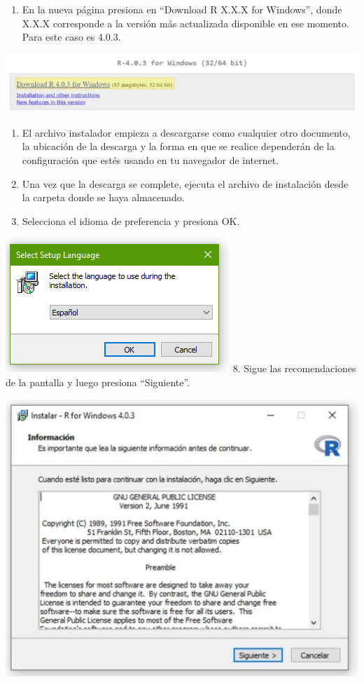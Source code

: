 \documentclass[
]{book}
\providecommand{\tightlist}{%
  \setlength{\itemsep}{0pt}\setlength{\parskip}{0pt}}
\begin{document}
\begin{enumerate}
\def\labelenumi{\arabic{enumi}.}
\setcounter{enumi}{3}
\tightlist
\item
  En la nueva página presiona en ``Download R X.X.X for Windows'', donde X.X.X corresponde a la versión más actualizada disponible en ese momento. Para este caso es 4.0.3.
\end{enumerate}

\includegraphics{data/03.jpg}

\begin{enumerate}
\def\labelenumi{\arabic{enumi}.}
\setcounter{enumi}{4}
\item
  El archivo instalador empieza a descargarse como cualquier otro documento, la ubicación de la descarga y la forma en que se realice dependerán de la configuración que estés usando en tu navegador de internet.
\item
  Una vez que la descarga se complete, ejecuta el archivo de instalación desde la carpeta donde se haya almacenado.
\item
  Selecciona el idioma de preferencia y presiona OK.
\end{enumerate}

\includegraphics{data/04.png}
8. Sigue las recomendaciones de la pantalla y luego presiona ``Siguiente''.

\includegraphics{data/08.jpg}
\end{document}
